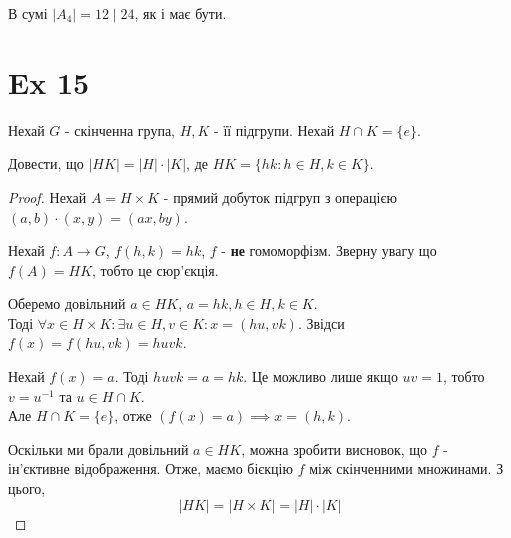 \documentclass[11pt, a4paper]{article} %
\begin{document}
В сумі $|A_4|=12 \mid 24$, як і має бути. 


\newpage
\section*{Ex 15}
\begin{mdframed}
    Нехай $G$ - скінченна група, $H,K$ - її підгрупи.
    Нехай $H\cap K = \{e\}$.
    
    Довести, що $|HK|=|H|\cdot |K|$, де $HK = \{hk : h\in H, k \in K\}$.
\end{mdframed}
\begin{proof}
    Нехай $A = H \times K$ - прямий добуток підгруп з операцією $(a,b)\cdot (x,y) = (ax,by)$.

    Нехай $f : A \to G$, $f(h,k) = hk$, $f$ - \textbf{не} гомоморфізм.
    Зверну увагу що $f(A) = HK$, тобто це сюр'єкція.

    Оберемо довільний $a \in HK$, $a = hk, h \in H, k \in K$.\\
    Тоді $\forall x \in H \times K: \exists u\in H, v \in K: x = (hu,vk)$.
    Звідси $f(x) = f(hu,vk) = huvk$.

    Нехай $f(x) = a$. Тоді $huvk = a = hk$. Це можливо лише якщо $uv=1$, тобто $v=u^{-1}$ та $u\in H\cap K$.\\
    Але $H\cap K = \{e\}$, отже $(f(x) = a) \implies x = (h,k)$.
    
    Оскільки ми брали довільний $a \in HK$, можна зробити висновок, що $f$ - ін'єктивне відображення.
    Отже, маємо бієкцію $f$ між скінченними множинами.
    З цього, 
    \[|HK| = |H\times K| = |H|\cdot |K|\]
\end{proof}
\end{document}
